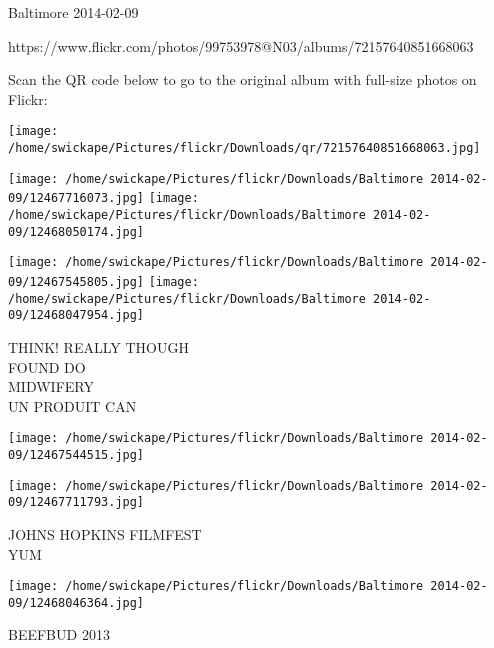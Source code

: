 \documentclass[10pt,letterpaper]{article}
\begin{document}
Baltimore 2014-02-09

https://www.flickr.com/photos/99753978@N03/albums/72157640851668063

Scan the QR code below to go to the original album with full-size photos on Flickr:

\texttt{[image: /home/swickape/Pictures/flickr/Downloads/qr/72157640851668063.jpg]}
\pagebreak

\texttt{[image: /home/swickape/Pictures/flickr/Downloads/Baltimore 2014-02-09/12467716073.jpg]}
\texttt{[image: /home/swickape/Pictures/flickr/Downloads/Baltimore 2014-02-09/12468050174.jpg]}

\texttt{[image: /home/swickape/Pictures/flickr/Downloads/Baltimore 2014-02-09/12467545805.jpg]}
\texttt{[image: /home/swickape/Pictures/flickr/Downloads/Baltimore 2014-02-09/12468047954.jpg]}

THINK!  REALLY THOUGH\\
FOUND DO\\
MIDWIFERY\\
UN PRODUIT CAN
\pagebreak

\texttt{[image: /home/swickape/Pictures/flickr/Downloads/Baltimore 2014-02-09/12467544515.jpg]}

\vspace{0.25in}
\texttt{[image: /home/swickape/Pictures/flickr/Downloads/Baltimore 2014-02-09/12467711793.jpg]}

JOHNS HOPKINS FILMFEST\\
YUM
\pagebreak

\texttt{[image: /home/swickape/Pictures/flickr/Downloads/Baltimore 2014-02-09/12468046364.jpg]}

BEEFBUD 2013
\pagebreak
\end{document}
